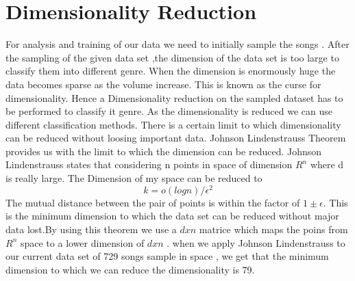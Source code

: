 \documentclass[12pt]{article}
\begin{document}
\section{Dimensionality Reduction}\label{dr}
For analysis and training of our data we need to initially sample the songs . After the sampling of the given data set  ,the dimension of the data set is too large to classify them into different genre. When the dimension is enormously huge the data becomes sparse as the volume increase. This is known as the curse for dimensionality. Hence a Dimensionality reduction on the sampled dataset has to be performed to classify it genre. As the dimensionality is reduced we can use different classification methods. There is a certain limit to which dimensionality can be reduced without loosing important data. Johnson Lindenstrauss Theorem provides us with the limit to which the dimension can be reduced.
Johnson Lindenstrauss states that considering n points in space of dimension $R^n$  where d is really large. The Dimension of my space can be reduced to $$k=o(log n)/\epsilon^2$$
The mutual distance between the pair of points is within the factor of $1\pm \epsilon$. This is the minimum dimension to which the data set can be reduced without major data lost.By using this theorem we use a $dxn$ matrice which maps the poins from $R^n$ space to a lower dimension of $dxn$ .
when we apply Johnson Lindenstrauss to our current data set of 729 songs sample in space , we get that the minimum dimension to which we can reduce the dimensionality is 79.
\end{document}
